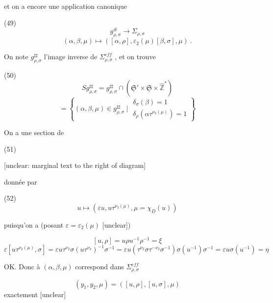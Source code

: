\begin{enumerate}
\newpage


et on a encore une application canonique

(49)
$$ g_{\rho,\sigma}^\# \longrightarrow \Sigma_{\rho,\sigma} $$
$$ (\alpha, \beta, \mu) \longmapsto ([\alpha, \rho], \varepsilon_2(\mu)[\beta, \sigma], \mu) \ . $$

On note $g_{\rho,\sigma}^{\sharp\sharp}$ l'image inverse de $\Sigma_{\rho,\sigma}^{eff}$ , et on trouve

(50)
$$ Sg_{\rho,\sigma}^{\sharp\sharp} = g_{\rho,\sigma}^{\sharp\sharp} \cap (\underline{\mathfrak{S}}' \times \underline{\mathfrak{S}} \times \hat{\mathbb{Z}}^*) $$
$$ = \left\{ (\alpha, \beta, \mu) \in g_{\rho,\sigma}^{\sharp\sharp} \mid \begin{matrix} \delta_\sigma(\beta) = 1 \\ \delta_\rho(\alpha \tau^{\nu_3(\mu)}) = 1 \end{matrix} \right\} $$

On a une section de

(51)

[unclear: marginal text to the right of diagram]

donnée par

(52)
$$ u \longmapsto (\varepsilon u, u \tau^{\nu_2(\mu)}, \mu = \chi_D(u)) $$

puisqu'on a (posant $\varepsilon = \varepsilon_2(\mu)$ [unclear])

$$ [u,\rho] = u \rho u^{-1} \rho^{-1} = \xi $$
$$ \varepsilon [u\tau^{\nu_2(\mu)}, \sigma] = \varepsilon u \tau^{\nu_2} \sigma (u\tau^{\nu_2})^{-1} \sigma^{-1} = \varepsilon u (\tau^{\nu_2} \sigma \tau^{-\nu_2} \sigma^{-1}) \sigma(u^{-1}) \sigma^{-1} = \varepsilon u \sigma(u^{-1}) = \eta $$

OK. Donc à $(\alpha, \beta, \mu)$ correspond dans $\Sigma_{\rho,\sigma}^{eff}$

$$ (y_1, y_2, \mu) = ([u,\rho], [u,\sigma], \mu) $$ exactement [unclear]

\newpage



\newpage


\end{enumerate}
